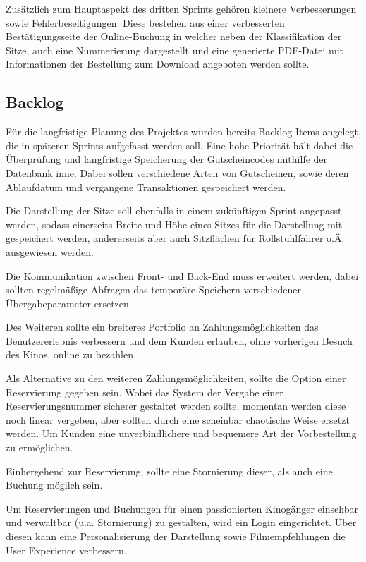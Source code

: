 Zusätzlich zum Hauptaspekt des dritten Sprints gehören kleinere Verbesserungen sowie Fehlerbeseitigungen. 
Diese bestehen aus einer verbesserten Bestätigungsseite der Online-Buchung in welcher neben der Klassifikation der Sitze, auch eine Nummerierung dargestellt und eine generierte PDF-Datei mit Informationen der Bestellung zum Download angeboten werden sollte.

\subsection{Backlog}
Für die langfristige Planung des Projektes wurden bereits Backlog-Items angelegt, die in späteren Sprints aufgefasst werden soll.
Eine hohe Priorität hält dabei die Überprüfung und langfristige Speicherung der Gutscheincodes mithilfe der Datenbank inne.
Dabei sollen verschiedene Arten von Gutscheinen, sowie deren Ablaufdatum und vergangene Transaktionen gespeichert werden. 

Die Darstellung der Sitze soll ebenfalls in einem zukünftigen Sprint angepasst werden, sodass einerseits Breite und Höhe eines Sitzes für die Darstellung mit gespeichert werden, andererseits aber auch Sitzflächen für Rollstuhlfahrer o.Ä. ausgewiesen werden.

Die Kommunikation zwischen Front- und Back-End muss erweitert werden, dabei sollten regelmäßige Abfragen das temporäre Speichern verschiedener Übergabeparameter ersetzen.

Des Weiteren sollte ein breiteres Portfolio an Zahlungsmöglichkeiten das Benutzererlebnis verbessern und dem Kunden erlauben, ohne vorherigen Besuch des Kinos, online zu bezahlen.

Als Alternative zu den weiteren Zahlungsmöglichkeiten, sollte die Option einer Reservierung gegeben sein.
Wobei das System der Vergabe einer Reservierungsnummer sicherer gestaltet werden sollte, momentan werden diese noch linear vergeben, aber sollten durch eine scheinbar chaotische Weise ersetzt werden.
Um Kunden eine unverbindlichere und bequemere Art der Vorbestellung zu ermöglichen.

Einhergehend zur Reservierung, sollte eine Stornierung dieser, als auch eine Buchung möglich sein.

Um Reservierungen und Buchungen für einen passionierten Kinogänger einsehbar und verwaltbar (u.a. Stornierung) zu gestalten, wird ein Login eingerichtet. 
Über diesen kann eine Personalisierung der Darstellung sowie Filmempfehlungen die User Experience verbessern.


